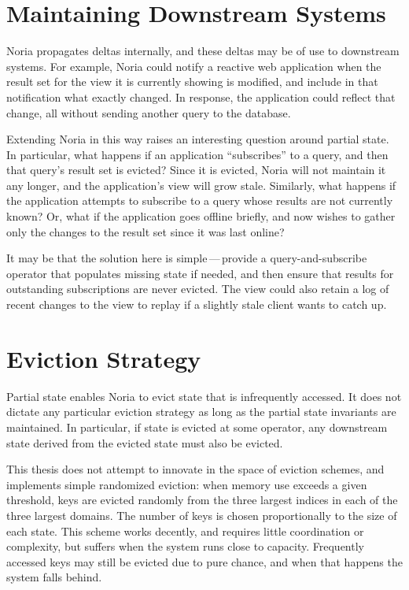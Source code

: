 \section{Maintaining Downstream Systems}

Noria propagates deltas internally, and these deltas may be of use to downstream
systems. For example, Noria could notify a reactive web application when the
result set for the view it is currently showing is modified, and include in that
notification what exactly changed. In response, the application could reflect
that change, all without sending another query to the database.

Extending Noria in this way raises an interesting question around partial state.
In particular, what happens if an application ``subscribes'' to a query, and
then that query's result set is evicted? Since it is evicted, Noria will not
maintain it any longer, and the application's view will grow stale. Similarly,
what happens if the application attempts to subscribe to a query whose results
are not currently known? Or, what if the application goes offline briefly, and
now wishes to gather only the changes to the result set since it was last
online?

It may be that the solution here is simple\,---\,provide a query-and-subscribe
operator that populates missing state if needed, and then ensure that results
for outstanding subscriptions are never evicted. The view could also retain a
log of recent changes to the view to replay if a slightly stale client wants to
catch up.

\section{Eviction Strategy}

Partial state enables Noria to evict state that is infrequently accessed. It
does not dictate any particular eviction strategy as long as the partial state
invariants are maintained. In particular, if state is evicted at some operator,
any downstream state derived from the evicted state must also be evicted.

This thesis does not attempt to innovate in the space of eviction schemes, and
implements simple randomized eviction: when memory use exceeds a given
threshold, keys are evicted randomly from the three largest indices in each of
the three largest domains. The number of keys is chosen proportionally to the
size of each state. This scheme works decently, and requires little coordination
or complexity, but suffers when the system runs close to capacity. Frequently
accessed keys may still be evicted due to pure chance, and when that happens the
system falls behind.

